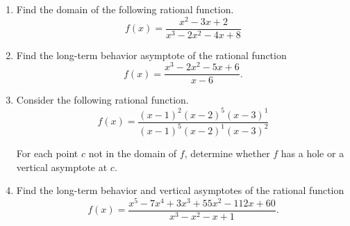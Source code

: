 \documentclass{article}
\begin{document}
\ActivityTitle[class={College Algebra}, number={6}, name={Rational Functions}]

\begin{enumerate}
\item Find the domain of the following rational function. \[ f(x) = \frac{x^2 - 3x + 2}{x^3 - 2x^2 - 4x + 8} \] \vspace{3cm}

\item Find the long-term behavior asymptote of the rational function \[ f(x) = \frac{x^3 - 2x^2 - 5x + 6}{x - 6}. \] \vspace{7cm}

\item Consider the following rational function. \[ f(x) = \frac{(x-1)^{2}(x-2)^{5}(x-3)^{1}}{(x-1)^{5}(x-2)^{1}(x-3)^{2}} \]

For each point $c$ not in the domain of $f$, determine whether $f$ has a hole or a vertical asymptote at $c$. \vspace{3cm}

\newpage

\item Find the long-term behavior and vertical asymptotes of the rational function \[ f(x) = \frac{x^5 - 7x^4 + 3x^3 + 55x^2 - 112x + 60}{x^3 - x^2 - x + 1}. \] \vspace{3cm}
\end{enumerate}
\end{document}
